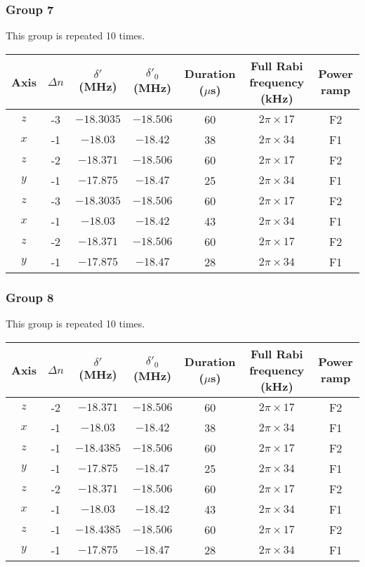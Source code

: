 \documentclass[aps,secnumarabic,amsmath,amssymb]{revtex4}
\begin{document}
\newpage
\subsubsection{Group 7}
This group is repeated 10 times.
\begin{center}
  \begin{tabular}{|c|c|c|c|c|c|c|}
    \hline
    Axis&$\Delta n$&$\delta'$ (MHz)&$\delta'_0$ (MHz)&Duration ($\mu$s)&Full Rabi frequency (kHz)&Power ramp\\\hline
    $z$&-3&$-18.3035$&$-18.506$&60&$2\pi\times17$&F2\\\hline
    $x$&-1&$-18.03$&$-18.42$&38&$2\pi\times34$&F1\\\hline
    $z$&-2&$-18.371$&$-18.506$&60&$2\pi\times17$&F2\\\hline
    $y$&-1&$-17.875$&$-18.47$&25&$2\pi\times34$&F1\\\hline
    $z$&-3&$-18.3035$&$-18.506$&60&$2\pi\times17$&F2\\\hline
    $x$&-1&$-18.03$&$-18.42$&43&$2\pi\times34$&F1\\\hline
    $z$&-2&$-18.371$&$-18.506$&60&$2\pi\times17$&F2\\\hline
    $y$&-1&$-17.875$&$-18.47$&28&$2\pi\times34$&F1\\\hline
  \end{tabular}
\end{center}
\subsubsection{Group 8}
This group is repeated 10 times.
\begin{center}
  \begin{tabular}{|c|c|c|c|c|c|c|}
    \hline
    Axis&$\Delta n$&$\delta'$ (MHz)&$\delta'_0$ (MHz)&Duration ($\mu$s)&Full Rabi frequency (kHz)&Power ramp\\\hline
    $z$&-2&$-18.371$&$-18.506$&60&$2\pi\times17$&F2\\\hline
    $x$&-1&$-18.03$&$-18.42$&38&$2\pi\times34$&F1\\\hline
    $z$&-1&$-18.4385$&$-18.506$&60&$2\pi\times17$&F2\\\hline
    $y$&-1&$-17.875$&$-18.47$&25&$2\pi\times34$&F1\\\hline
    $z$&-2&$-18.371$&$-18.506$&60&$2\pi\times17$&F2\\\hline
    $x$&-1&$-18.03$&$-18.42$&43&$2\pi\times34$&F1\\\hline
    $z$&-1&$-18.4385$&$-18.506$&60&$2\pi\times17$&F2\\\hline
    $y$&-1&$-17.875$&$-18.47$&28&$2\pi\times34$&F1\\\hline
  \end{tabular}
\end{center}
\end{document}

